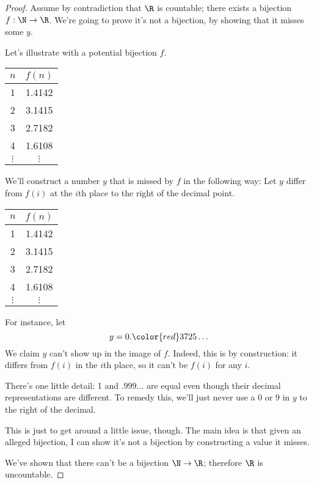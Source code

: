 \begin{proof}
Assume by contradiction that $\R$ is countable; there exists a bijection $f:\N\to \R$. We're going to prove it's not a bijection, by showing that it misses some $y$.

Let's illustrate with a potential bijection $f$.

\begin{center}
\begin{tabular}{c|c}
$n$ & $f(n)$\tabularnewline
\hline 
1 & 1.4142\tabularnewline
2 & 3.1415\tabularnewline
3 & 2.7182\tabularnewline
4 & 1.6108\tabularnewline
$\vdots$ & $\vdots$\tabularnewline
\end{tabular}
\end{center}

We'll construct a number $y$ that is missed by $f$ in the following way: Let $y$ differ from $f(i)$ at the $i$th place to the right of the decimal point.

\begin{center}
\begin{tabular}{c|c}
$n$ & $f(n)$\tabularnewline
\hline 
1 & 1.{\color{red}4}142\tabularnewline
2 & 3.1{\color{red}4}15\tabularnewline
3 & 2.71{\color{red}8}2\tabularnewline
4 & 1.610{\color{red}8}\tabularnewline
$\vdots$ & $\vdots$\tabularnewline
\end{tabular}
\end{center}

For instance, let
\[
y=0.{\color{red}3725}\ldots
\]
We claim $y$ can't show up in the image of $f$. Indeed, this is by construction: it differs from $f(i)$ in the $i$th place, so it can't be $f(i)$ for any $i$.

There's one little detail: 1 and $.999\ldots$ are equal even though their decimal representations are different. 
To remedy this, we'll just never use a 0 or 9 in $y$ to the right of the decimal. 

This is just to get around a little issue, though. The main idea is that given an alleged bijection, I can show it's not a bijection by constructing a value it misses.

We've shown that there can't be a bijection $\N\to \R$; therefore $\R$ is uncountable.
\end{proof}

